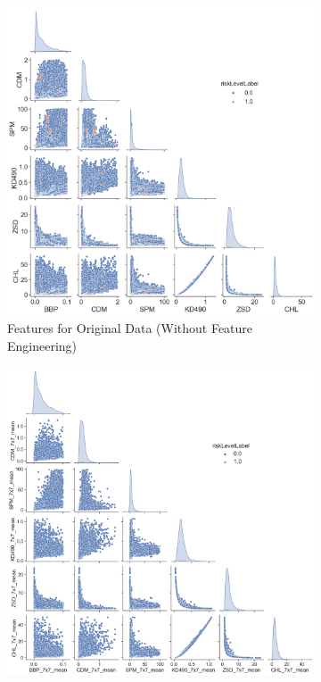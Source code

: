 \documentclass[a4paper,11pt]{report}
\begin{document}
\begin{figure}[H]
\centering
\captionsetup{width=.9\linewidth}

\begin{subfigure}[c]{0.45\textwidth} %
    \centering
    \includegraphics[width=\linewidth]{images/original_pairplot.png}
    \caption{Features for Original Data (Without Feature Engineering)}
    \label{fig:pair}
\end{subfigure}
\hfill %
\begin{subfigure}[c]{0.45\textwidth} %
    \centering
    \includegraphics[width=\linewidth]{images/7x7_mean_pairplot.png}

\end{subfigure}
\end{figure}
\end{document}
